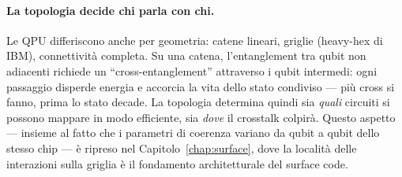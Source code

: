 \paragraph{La topologia decide chi parla con chi.}
Le QPU differiscono anche per geometria: catene lineari, griglie (heavy-hex di IBM), connettività completa. Su una catena, l'entanglement tra qubit non adiacenti richiede un ``cross-entanglement'' attraverso i qubit intermedi: ogni passaggio disperde energia e accorcia la vita dello stato condiviso --- più cross si fanno, prima lo stato decade. La topologia determina quindi sia \emph{quali} circuiti si possono mappare in modo efficiente, sia \emph{dove} il crosstalk colpirà. Questo aspetto --- insieme al fatto che i parametri di coerenza variano da qubit a qubit dello stesso chip --- è ripreso nel Capitolo~\ref{chap:surface}, dove la località delle interazioni sulla griglia è il fondamento architetturale del surface code.
